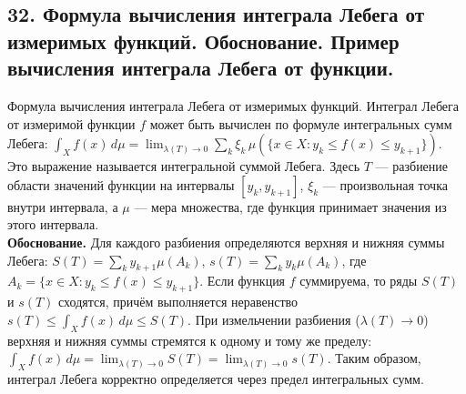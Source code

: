 \documentclass[12pt]{article}
\begin{document}
\subsection*{32. Формула вычисления интеграла Лебега от измеримых функций. Обоснование. Пример
вычисления интеграла Лебега от функции.}
Формула вычисления интеграла Лебега от измеримых функций. Интеграл Лебега от измеримой функции $f$ может быть вычислен по формуле интегральных сумм Лебега: $\int_X f(x)\,d\mu=\lim_{\lambda(T)\to 0}\sum_k \xi_k\,\mu(\{x\in X:y_k\leq f(x)\leq y_{k+1}\})$. Это выражение называется интегральной суммой Лебега. Здесь $T$ — разбиение области значений функции на интервалы $[y_k,y_{k+1}]$, $\xi_k$ — произвольная точка внутри интервала, а $\mu$ — мера множества, где функция принимает значения из этого интервала. \\\textbf{Обоснование.} Для каждого разбиения определяются верхняя и нижняя суммы Лебега: $S(T)=\sum_k y_{k+1}\mu(A_k)$, $s(T)=\sum_k y_k\mu(A_k)$, где $A_k=\{x\in X:y_k\leq f(x)\leq y_{k+1}\}$. Если функция $f$ суммируема, то ряды $S(T)$ и $s(T)$ сходятся, причём выполняется неравенство $s(T)\leq \int_X f(x)\,d\mu \leq S(T)$. При измельчении разбиения ($\lambda(T)\to 0$) верхняя и нижняя суммы стремятся к одному и тому же пределу: $\int_X f(x)\,d\mu=\lim_{\lambda(T)\to 0}S(T)=\lim_{\lambda(T)\to 0}s(T)$. Таким образом, интеграл Лебега корректно определяется через предел интегральных сумм.

\end{document}
